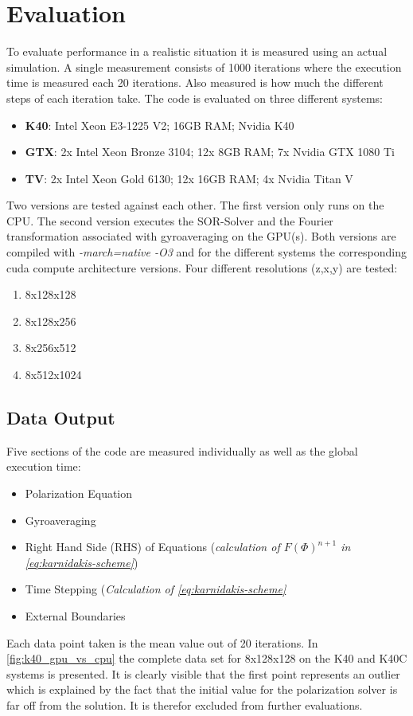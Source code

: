 \documentclass[master.tex]{subfiles}
\begin{document}
\section{Evaluation}
To evaluate performance in a realistic situation it is measured using an actual simulation. A single measurement consists of 1000 iterations where the execution time is measured each 20 iterations. Also measured is how much the different steps of each iteration take.\newline
The code is evaluated on three different systems:
\begin{itemize}
    \item \textbf{\ac{K40}}: Intel Xeon E3-1225 V2; 16GB RAM; Nvidia K40
    \item \textbf{\ac{GTX}}: 2x Intel Xeon Bronze 3104; 12x 8GB RAM; 7x Nvidia GTX 1080 Ti
    \item \textbf{\ac{TV}}: 2x Intel Xeon Gold 6130; 12x 16GB RAM; 4x Nvidia Titan V
\end{itemize}
Two versions are tested against each other. The first version only runs on the CPU. The second version executes the \ac{SOR}-Solver and the Fourier transformation associated with gyroaveraging on the GPU(s). Both versions are compiled with \textit{-march=native -O3} and for the different systems the corresponding cuda compute architecture versions. Four different resolutions (z,x,y) are tested:
\begin{enumerate}
    \item 8x128x128
    \item 8x128x256
    \item 8x256x512
    \item 8x512x1024
\end{enumerate}

\subsection{Data Output}
Five sections of the code are measured individually as well as the global execution time:
\begin{itemize}
    \item Polarization Equation
    \item Gyroaveraging
    \item Right Hand Side (RHS) of Equations (\textit{calculation of $F(\Phi)^{n+1}$ in \autoref{eq:karnidakis-scheme}})
    \item Time Stepping (\textit{Calculation of \autoref{eq:karnidakis-scheme}}
    \item External Boundaries
\end{itemize}
Each data point taken is the mean value out of 20 iterations. In \autoref{fig:k40_gpu_vs_cpu} the complete data set for 8x128x128 on the \ac{K40} and \ac{K40C} systems is presented. It is clearly visible that the first point represents an outlier which is explained by the fact that the initial value for the polarization solver is far off from the solution. It is therefor excluded from further evaluations. 
\end{document}
